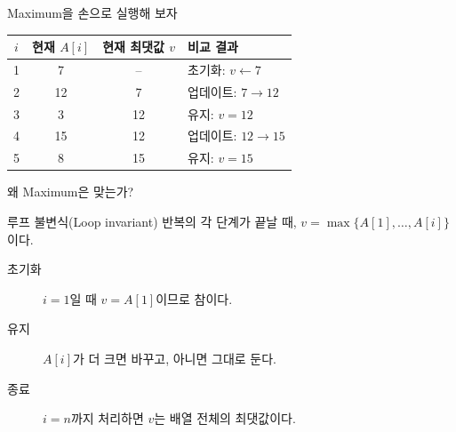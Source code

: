 \begin{frame}{Maximum을 손으로 실행해 보자}
  \begin{center}
  \end{center}
  \begin{tabular}{@{}c c c l@{}}
    \toprule
    $i$ & \textcolor{AlgoOrangeText}{현재 $A[i]$}
        & \textcolor{AlgoBlueTwo}{현재 최댓값 $v$} & 비교 결과 \\
    \midrule
    1 & \textcolor{AlgoOrangeText}{7}  & -- & 초기화: $v\gets7$ \\
    2 & \textcolor{AlgoOrangeText}{12} & 7  & \textcolor{AlgoOrangeText}{업데이트: $7\to12$} \\
    3 & \textcolor{AlgoOrangeText}{3}  & 12 & 유지: $v=12$ \\
    4 & \textcolor{AlgoOrangeText}{15} & 12 & \textcolor{AlgoOrangeText}{업데이트: $12\to15$} \\
    5 & \textcolor{AlgoOrangeText}{8}  & 15 & 유지: $v=15$ \\
    \bottomrule
  \end{tabular}
\end{frame}

\begin{frame}{왜 Maximum은 맞는가?}
  \begin{block}{루프 불변식(Loop invariant)}
    반복의 각 단계가 끝날 때, $v=\max\{A[1],\ldots,A[i]\}$이다.
  \end{block}
  \begin{description}
    \item[초기화] $i=1$일 때 $v=A[1]$이므로 참이다.
    \item[유지] $A[i]$가 더 크면 바꾸고, 아니면 그대로 둔다.
    \item[종료] $i=n$까지 처리하면 $v$는 배열 전체의 최댓값이다.
  \end{description}
\end{frame}

